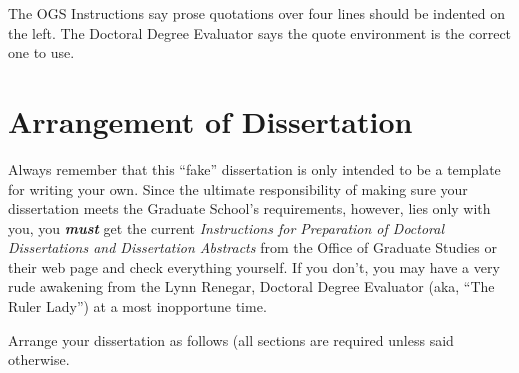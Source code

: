 The OGS Instructions say prose quotations over four lines
should be indented on the left. The Doctoral Degree Evaluator says
the quote environment is the correct one to use.

\section{Arrangement of Dissertation}
%

Always remember that this ``fake'' dissertation 
%
is only intended to be a template for writing your own. Since the ultimate
responsibility of making sure your dissertation meets the Graduate School's
requirements, however, lies only with you, you \textbf{\textit{must}} get
the current \emph{Instructions for Preparation of Doctoral Dissertations and
Dissertation Abstracts} from the Office of Graduate Studies or their web
page and check everything yourself. If you don't, you may have a very
rude awakening from the Lynn Renegar, Doctoral Degree Evaluator (aka,
``The Ruler Lady'') at a most inopportune time.

Arrange your dissertation as follows (all sections are required 
unless said otherwise.

